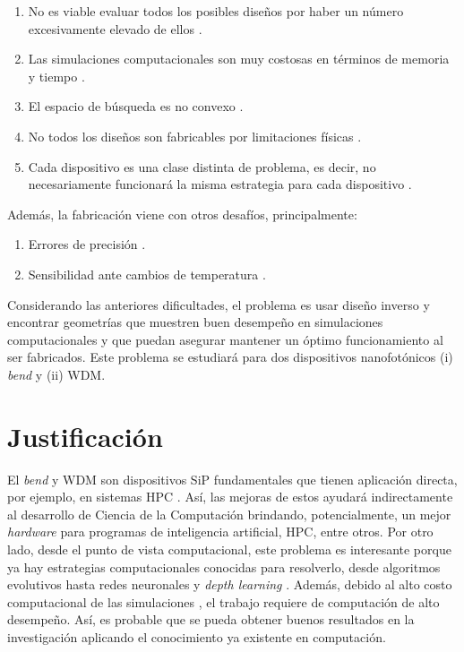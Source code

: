 \begin{enumerate}
  \item No es viable evaluar todos los posibles diseños por haber un número excesivamente elevado de ellos \citep{Vuckovic2019}.
  \item Las simulaciones computacionales son muy costosas en términos de memoria y tiempo \citep{Kudyshev2020}.
  \item El espacio de búsqueda es no convexo \citep{Su2018}.
  \item No todos los diseños son fabricables por limitaciones físicas \citep{Su2020}.
  \item Cada dispositivo es una clase distinta de problema, es decir, no necesariamente funcionará la misma estrategia para cada dispositivo \citep{Molesky2018}.
\end{enumerate}

Además, la fabricación viene con otros desafíos, principalmente:

\begin{enumerate}
  \item Errores de precisión \citep{Piggott2017}.
  \item Sensibilidad ante cambios de temperatura \citep{Vuckovic2019}.
\end{enumerate}

Considerando las anteriores dificultades, el problema es usar diseño inverso y encontrar geometrías que muestren buen desempeño en simulaciones computacionales y que puedan asegurar mantener un óptimo funcionamiento al ser fabricados. 
Este problema se estudiará para dos dispositivos nanofotónicos (i) \emph{bend} y (ii) WDM.

\section{Justificación}

El \emph{bend} y WDM son dispositivos SiP fundamentales que tienen aplicación
directa, por ejemplo, en sistemas HPC \citep{Shen2017}.
Así, las mejoras de estos ayudará indirectamente al desarrollo de Ciencia
de la Computación brindando, potencialmente, un mejor \emph{hardware} para programas de
inteligencia artificial, HPC, entre otros.
Por otro lado, desde el punto de vista computacional, este problema es interesante porque ya hay estrategias computacionales conocidas para resolverlo, desde algoritmos evolutivos \citep{Hansen2016} hasta redes neuronales \citep{Goodfellow2015} y \emph{depth learning} \citep{Malkiel2018}. 
Además, debido al alto costo computacional de las simulaciones \citep{Schneider2019}, el trabajo requiere de computación de alto desempeño.
Así, es probable que se pueda obtener buenos resultados en la investigación aplicando el conocimiento ya existente en computación. 

